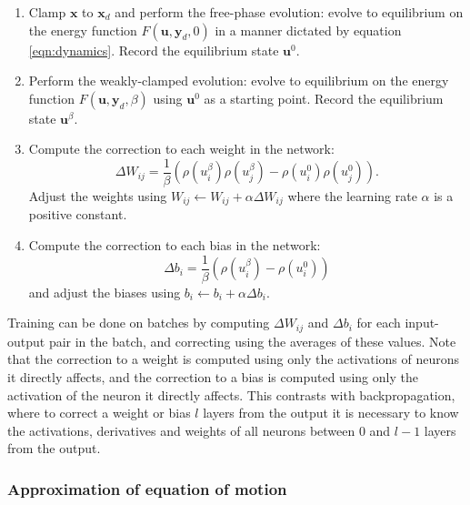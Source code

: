 \documentclass[format=sigconf]{acmart}
\newcommand{\mtx}[1]{\bm{#1}}
\begin{document}
\begin{enumerate}
\item Clamp $\mtx{x}$ to $\mtx{x}_d$ and perform the free-phase evolution: evolve to equilibrium on the energy function $F(\mtx{u}, \mtx{y}_d, 0)$ in a manner dictated by equation \ref{eqn:dynamics}. Record the equilibrium state $\mtx{u}^0$.
\item Perform the weakly-clamped evolution: evolve to equilibrium on the energy function $F(\mtx{u},\mtx{y}_d,\beta)$ using $\mtx{u}^0$ as a starting point. Record the equilibrium state $\mtx{u}^{\beta}$.
\item Compute the correction to each weight in the network: 
\begin{equation}
\label{eqn:weight_correction}
\Delta W_{ij}=\frac{1}{\beta}(\rho(u_i^\beta)\rho(u_j^\beta)-\rho(u_i^0)\rho(u_j^0)).
\end{equation}
Adjust the weights using $W_{ij}\leftarrow W_{ij}+\alpha\Delta W_{ij}$ where the learning rate $\alpha$ is a positive constant.
\item Compute the correction to each bias in the network:
\begin{equation}
\Delta b_i=\frac{1}{\beta}(\rho(u_i^{\beta})-\rho(u_i^0))
\end{equation}
and adjust the biases using $b_i\leftarrow b_i+\alpha\Delta b_i$.
\end{enumerate}
Training can be done on batches by computing $\Delta W_{ij}$ and $\Delta b_i$ for each input-output pair in the batch, and correcting using the averages of these values. Note that the correction to a weight is computed using only the activations of neurons it directly affects, and the correction to a bias is computed using only the activation of the neuron it directly affects. This contrasts with backpropagation, where to correct a weight or bias $l$ layers from the output it is necessary to know the activations, derivatives and weights of all neurons between $0$ and $l-1$ layers from the output.

\subsubsection{Approximation of equation of motion}
\end{document}

